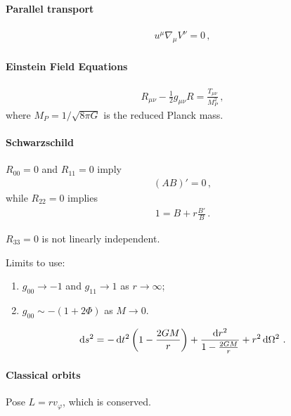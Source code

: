 \documentclass[main.tex]{subfiles}
\begin{document}
\paragraph{Parallel transport}

\begin{align}
u^{\mu } \nabla_{\mu } V^{\nu } =0
\,,
\end{align}

\paragraph{Einstein Field Equations}

%
\begin{align}
R_{\mu \nu } - \frac{1}{2} g_{\mu \nu } R = \frac{T_{\mu \nu } }{M_P^2}
\,,
\end{align}
%
where 
\(M_P = 1 / \sqrt{8 \pi G}\) is the reduced Planck mass.

\paragraph{Schwarzschild}

\(R_{00} =0\) and \(R_{11} =0 \) imply 
%
\begin{align}
(AB)' = 0
\,,
\end{align}
%
while \(R_{22} =0\) implies 
%
\begin{align}
1 = B + r \frac{B'}{B}
\,.
\end{align}

\(R_{33} =0\) is not linearly independent.  

Limits to use: 
\begin{enumerate}
  \item \(g_{00} \rightarrow -1\) and \(g_{11} \rightarrow 1\) as \(r \rightarrow \infty \);
  \item \(g_{00} \sim -(1 + 2 \Phi )\) as \(M \rightarrow 0\).
\end{enumerate}


\begin{align}
\dd{s^2} = - \dd{t^2} \qty(1 - \frac{2GM}{r})
+ \frac{ \dd{r^2}}{1 - \frac{2GM}{r}} + r^2 \dd{\Omega^2}
\,.
\end{align}
%

\paragraph{Classical orbits}

Pose \(L = r v_{\varphi }\), which is conserved. 
\end{document}
